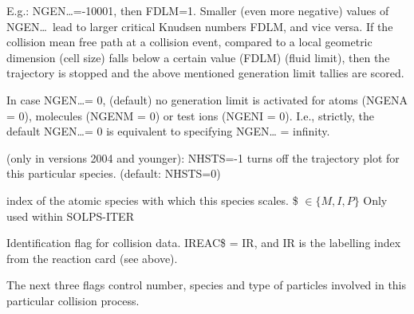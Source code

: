 \begin{description}
\begin{description}
                E.g.:  NGEN\dots=-10001, then FDLM=1.
                Smaller (even more negative) values of NGEN\dots\ lead to larger critical
                Knudsen numbers FDLM, and vice versa.
                If the collision mean free path at a collision event, compared to a local
                geometric dimension (cell size) falls below a certain value (FDLM) (fluid
                limit), then the trajectory is stopped and the above mentioned generation limit
                tallies are scored.
          \item[$= 0$] In case NGEN\dots = 0, (default) no generation limit is activated
                for atoms (NGENA = 0), molecules (NGENM = 0) or test ions (NGENI = 0).
                I.e., strictly, the default NGEN\dots = 0 is equivalent to specifying NGEN\dots
                = infinity.
        \end{description}

  \item[NHSTS\$] (only in versions 2004 and younger): NHSTS=-1 turns off the
        trajectory plot for this particular species.
        (default: NHSTS=0)
  \item[LKIND\$] index of the atomic species with which this species scales.
        {\$} $ \in \{ M, I, P \} $  
        Only used within SOLPS-ITER
  \item[IREAC\$] Identification flag
        for collision data.
        IREAC\$ = IR, and IR is the labelling index from the reaction card (see above).
\end{description}
The next three flags control number, species and type of particles involved in
this particular collision process.
